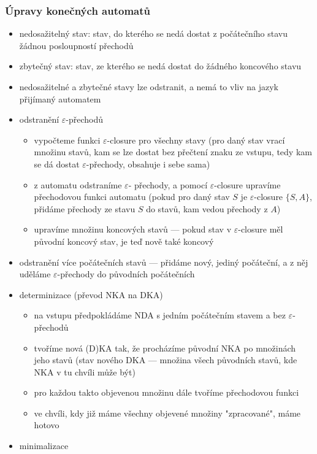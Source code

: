 \subsubsection*{Úpravy konečných automatů}
\begin{itemize}
	\item nedosažitelný stav: stav, do kterého se nedá dostat z počátečního stavu žádnou posloupností přechodů
	\item zbytečný stav: stav, ze kterého se nedá dostat do žádného koncového stavu
	\item nedosažitelné a zbytečné stavy lze odstranit, a nemá to vliv na jazyk přijímaný automatem
	\item odstranění $\varepsilon$-přechodů
	\begin{itemize}
		\item vypočteme funkci $\varepsilon$-closure pro všechny stavy (pro daný stav vrací množinu stavů, kam se lze dostat bez přečtení znaku ze vstupu, tedy kam se dá dostat $\varepsilon$-přechody, obsahuje i sebe sama)
		\item z automatu odstraníme $\varepsilon$- přechody, a pomocí $\varepsilon$-closure upravíme přechodovou funkci automatu (pokud pro daný stav $S$ je $\varepsilon$-closure $\{S, A\}$, přidáme přechody ze stavu $S$ do stavů, kam vedou přechody z $A$)
		\item upravíme množinu koncových stavů --- pokud stav v $\varepsilon$-closure měl původní koncový stav, je teď nově také koncový
	\end{itemize}
	\item odstranění více počátečních stavů --- přidáme nový, jediný počáteční, a z něj uděláme $\varepsilon$-přechody do původních počátečních
	\item determinizace (převod NKA na DKA)
	\begin{itemize}
		\item na vstupu předpokládáme NDA s jedním počátečním stavem a bez $\varepsilon$-přechodů
		\item tvoříme nová (D)KA tak, že procházíme původní NKA po množinách jeho stavů (stav nového DKA --- množina všech původních stavů, kde NKA v tu chvíli může být)
		\item pro každou takto objevenou množinu dále tvoříme přechodovou funkci
		\item ve chvíli, kdy již máme všechny objevené množiny "zpracované", máme hotovo
	\end{itemize}
	\item minimalizace
	\begin{itemize}

\end{itemize}
\end{itemize}
